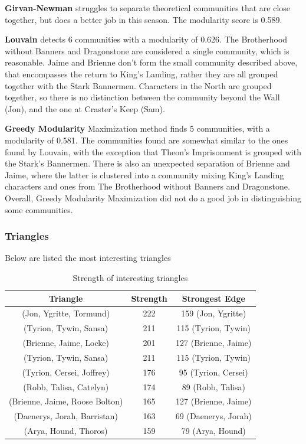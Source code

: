 \documentclass[10pt,twocolumn,letterpaper]{article}
\begin{document}
\textbf{Girvan-Newman} struggles to separate theoretical communities that are close together, but does a better job in this season. The modularity score is 0.589.

\textbf{Louvain} detects 6 communities with a modularity of 0.626. The Brotherhood without Banners and Dragonstone are considered a single community, which is reasonable. Jaime and Brienne don't form the small community described above, that encompasses the return to King's Landing, rather they are all grouped together with the Stark Bannermen. Characters in the North are grouped together, so there is no distinction between the community beyond the Wall (Jon), and the one at Craster's Keep (Sam).

\textbf{Greedy Modularity} Maximization method finds 5 communities, with a modularity of 0.581. The communities found are somewhat similar to the ones found by Louvain, with the exception that Theon's Imprisonment is grouped with the Stark's Bannermen. There is also an unexpected separation of Brienne and Jaime, where the latter is clustered into a community mixing King's Landing characters and ones from The Brotherhood without Banners and Dragonstone. Overall, Greedy Modularity Maximization did not do a good job in distinguishing some communities.

\subsubsection{Triangles}

Below are listed the most interesting triangles

\begin{table}[h!]
    \centering
    \small
    \begin{tabular}{c|c|c}
        Triangle & Strength & Strongest Edge  \\
        \hline
        \small{(Jon, Ygritte, Tormund)} & 222 & 159 \small{(Jon, Ygritte)} \\
        \small{(Tyrion, Tywin, Sansa)} & 211 & 115 \small{(Tyrion, Tywin)}\\
        \small{(Brienne, Jaime, Locke)} & 201 & 127 \small{(Brienne, Jaime)}\\
        \small{(Tyrion, Tywin, Sansa)} & 211 & 115 \small{(Tyrion, Tywin)}\\
        \small{(Tyrion, Cersei, Joffrey)} & 176 & 95 \small{(Tyrion, Cersei)}\\
        \small{(Robb, Talisa, Catelyn)} & 174 & 89 \small{(Robb, Talisa)}\\
        \small{(Brienne, Jaime, Roose Bolton)} & 165 & 127 \small{(Brienne, Jaime)}\\
        \small{(Daenerys, Jorah, Barristan)} & 163 & 69 \small{(Daenerys, Jorah)}\\
        \small{(Arya, Hound, Thoros)} & 159 & 79 \small{(Arya, Hound)}\\
        \hline 
    \end{tabular} \\
    \vspace{0.2cm}
    \caption{Strength of interesting triangles}
    \label{tab:my_label}
\end{table}
\end{document}
